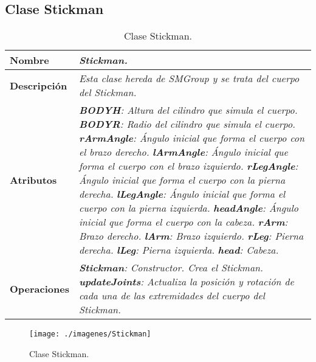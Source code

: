       \subsection{Clase Stickman}
         \begin{table}[!ht] 
            \centering
            \begin{tabular}{|p{4cm}|p{11.5cm}|}
            \hline
            \textbf{Nombre} & \textit{Stickman.}\\ \hline
            \textbf{Descripción} & \textit{Esta clase hereda de SMGroup y se trata del cuerpo del Stickman.}\\ \hline
            \textbf{Atributos} & \textit{\textbf{BODYH}: Altura del cilindro que simula el cuerpo.}\newline
                                 \textit{\textbf{BODYR}: Radio del cilindro que simula el cuerpo.}\newline
                                 \textit{\textbf{rArmAngle}: Ángulo inicial que forma el cuerpo con el brazo derecho.}\newline
                                 \textit{\textbf{lArmAngle}: Ángulo inicial que forma el cuerpo con el brazo izquierdo.}\newline
                                 \textit{\textbf{rLegAngle}: Ángulo inicial que forma el cuerpo con la pierna derecha.}\newline
                                 \textit{\textbf{lLegAngle}: Ángulo inicial que forma el cuerpo con la pierna izquierda.}\newline
                                 \textit{\textbf{headAngle}: Ángulo inicial que forma el cuerpo con la cabeza.}\newline
                                 \textit{\textbf{rArm}: Brazo derecho.}\newline
                                 \textit{\textbf{lArm}: Brazo izquierdo.}\newline
                                 \textit{\textbf{rLeg}: Pierna derecha.}\newline
                                 \textit{\textbf{lLeg}: Pierna izquierda.}\newline
                                 \textit{\textbf{head}: Cabeza.}\\ \hline
            \textbf{Operaciones} & \textit{\textbf{Stickman}: Constructor. Crea el Stickman.}\newline
                                    \textit{\textbf{updateJoints}: Actualiza la posición y rotación de cada una de las extremidades
                                          del cuerpo del Stickman.}\\ \hline
            \end{tabular}
            \caption{Clase Stickman.}
         \end{table}
         \begin{figure} [H] \begin{center}
            \texttt{[image: ./imagenes/Stickman]}\label{Stickman}
            \caption{Clase Stickman.}
         \end{center} \end{figure}


